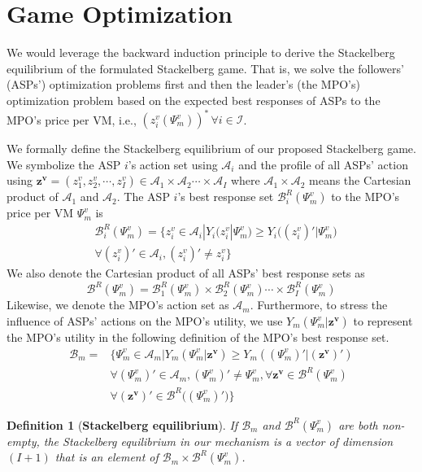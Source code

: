\documentclass[10pt,journal, compsoc]{IEEEtran}
\newtheorem{definition}{Definition}
\begin{document}
\section{Game Optimization} \label{sec:game_optimization}
We would leverage the backward induction principle to derive the Stackelberg equilibrium of the formulated Stackelberg game. That is, we solve the followers' (ASPs') optimization problems first and then the leader's (the MPO's) optimization problem based on the expected best responses of ASPs to the MPO's price per VM, i.e., $(z_i^v(\Psi_m^v))^* \, \forall i \in \mathcal{I}$. 

We formally define the Stackelberg equilibrium \cite{bacsar1998dynamic} of our proposed Stackelberg game. We symbolize the ASP $i$'s action set using $\mathcal{A}_i$ and the profile of all ASPs' action using $\bm{z^v}=(z_1^v, z_2^v, \cdots, z_I^v) \in \mathcal{A}_1 \times \mathcal{A}_2 \cdots \times \mathcal{A}_I$ where $\mathcal{A}_1 \times \mathcal{A}_2$ means the Cartesian product of $\mathcal{A}_1$ and $\mathcal{A}_2$. The ASP $i$'s best response set $\mathcal{B}_i^R(\Psi_m^v)$ to the MPO's price per VM $\Psi_m^v$ is 
\begin{equation} \label{eqn:asp_best_response}
\begin{aligned}
&\mathcal{B}_i^R(\Psi_m^v) = \{z_i^v \in \mathcal{A}_i |Y_i(z_i^v|\Psi_m^v) \geq Y_i\big((z_i^v)'|\Psi_m^v\big) \\
&\forall (z_i^v)' \in \mathcal{A}_i, (z_i^v)' \neq z_i^v\}
\end{aligned}
\end{equation}
We also denote the Cartesian product of all ASPs' best response sets as
\begin{equation}
\mathcal{B}^R(\Psi_m^v) = \mathcal{B}_1^R(\Psi_m^v) \times \mathcal{B}_2^R(\Psi_m^v) \cdots \times \mathcal{B}_I^R(\Psi_m^v)
\end{equation}
Likewise, we denote the MPO's action set as $\mathcal{A}_m$. Furthermore, to stress the influence of ASPs' actions on the MPO's utility, we use $Y_m(\Psi_m^v|\bm{z^v})$ to represent the MPO's utility in the following definition of the MPO's best response set.
\begin{equation} \label{eqn:mpo_best_response}
\begin{aligned}
\mathcal{B}_m = &\{\Psi_m^v \in \mathcal{A}_m| Y_m(\Psi_m^v|\bm{z^v}) \geq Y_m((\Psi_m^v)'|(\bm{z^v})') \\
&\forall (\Psi_m^v)' \in \mathcal{A}_m, (\Psi_m^v)' \neq \Psi_m^v, \forall \bm{z^v} \in \mathcal{B}^R(\Psi_m^v) \\
&\forall  (\bm{z^v})' \in \mathcal{B}^R\big((\Psi_m^v)'\big)\}
\end{aligned}
\end{equation}
\begin{definition}[\textbf{Stackelberg equilibrium}] \label{def:stackelberg_equilibrium}
If $\mathcal{B}_{m}$ and $\mathcal{B}^R(\Psi_m^v)$ are both non-empty, the Stackelberg equilibrium in our mechanism is a vector of dimension $(I+1)$ that is an element of $\mathcal{B}_m  \times \mathcal{B}^R(\Psi_m^v)$.
\end{definition}
\end{document}
